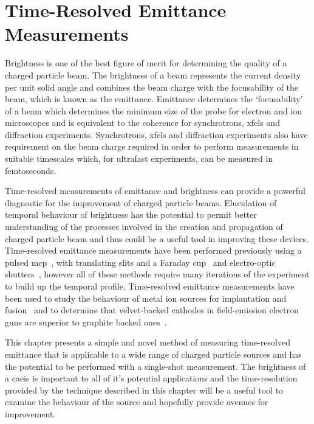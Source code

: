 \chapter{Time-Resolved Emittance Measurements}

Brightness is one of the best figure of merit for determining the quality of a charged particle beam.
The brightness of a beam represents the current density per unit solid angle and combines the beam charge with the focusability of the beam, which is known as the emittance.
Emittance determines the `focusability' of a beam which determines the minimum size of the probe for electron and ion microscopes and is equivalent to the coherence for synchrotrons, \glspl{xfel} and diffraction experiments.
Synchrotrons, \glspl{xfel} and diffraction experiments also have requirement on the beam charge required in order to perform measurements in suitable timescales which, for ultrafast experiments, can be measured in femtoseconds.

Time-resolved measurements of emittance and brightness can provide a powerful diagnostic for the improvement of charged particle beams.
Elucidation of temporal behaviour of brightness has the potential to permit better understanding of the processes involved in the creation and propagation of charged particle beam and thus could be a useful tool in improving these devices.
Time-resolved emittance measurements have been performed previously using a pulsed \gls{mcp}~\cite{yoshida_simple_2001}, with translating slits and a Faraday cup~\cite{anders_time-resolved_2003} and electro-optic shutters~\cite{bekefi_temporal_1987}, however all of these methods require many iterations of the experiment to build up the temporal profile.
Time-resolved emittance measurements have been used to study the behaviour of metal ion sources for implantation and fusion~\cite{anders_time-resolved_2003, yoshida_simple_2001} and to determine that velvet-backed cathodes in field-emission electron guns are superior to graphite backed ones~\cite{bekefi_temporal_1987}.

This chapter presents a simple and novel method of measuring time-resolved emittance that is applicable to a wide range of charged particle sources and has the potential to be performed with a single-shot measurement.
The brightness of a \gls{caeis} is important to all of it's potential applications and the time-resolution provided by the technique described in this chapter will be a useful tool to examine the behaviour of the source and hopefully provide avenues for improvement.

